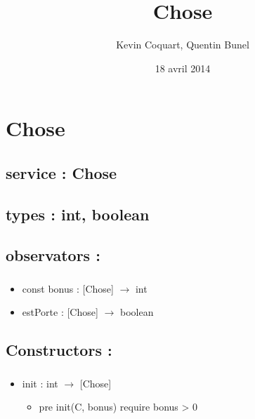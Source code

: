 \documentclass[11pt]{article}
\title{Chose}
\author{Kevin Coquart, Quentin Bunel}
\date{18 avril 2014}
\begin{document}
\maketitle

\setcounter{tocdepth}{3}
\tableofcontents
\vspace*{1cm}
\section{Chose}
\label{sec-1}

\subsection{service : Chose}
\label{sec-1.1}

\subsection{types : int, boolean}
\label{sec-1.2}



\subsection{observators :}
\label{sec-1.3}

\subsubsection{}

\begin{itemize}

\item const bonus : [Chose] $\to$ int\\
\label{sec-1.3.1.1}


\item estPorte : [Chose] $\to$ boolean\\
\label{sec-1.3.1.2}


\end{itemize} %
\subsection{Constructors :}
\label{sec-1.4}

\subsubsection{}

\begin{itemize}

\item init : int $\to$ [Chose]\\
\label{sec-1.4.1.1}

\begin{itemize}

\item pre init(C, bonus) require bonus > 0\\
\label{sec-1.4.1.1.1}


\end{itemize} %
\end{itemize} %
\end{document}
